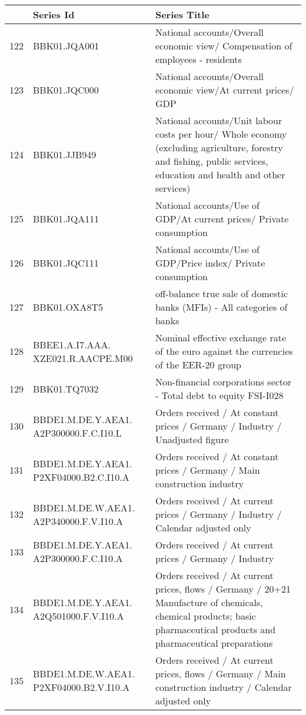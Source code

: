 \documentclass[11pt]{article}
\begin{document}
\begin{table}
\centering
\begin{tabular}{rp{5cm}p{11cm}}
& \textbf{Series Id} & \textbf{Series Title} \\
  \hline
  \hline
  122 & BBK01.JQA001 & National accounts/Overall economic view/ Compensation of employees - residents \\ 
  \hline
  123 & BBK01.JQC000 & National accounts/Overall economic view/At current prices/ GDP \\ 
  \hline
  124 & BBK01.JJB949 & National accounts/Unit labour costs per hour/ Whole economy (excluding agriculture, forestry and fishing, public services, education and health and other services) \\ 
  \hline
  125 & BBK01.JQA111 & National accounts/Use of GDP/At current prices/ Private consumption \\ 
  \hline
  126 & BBK01.JQC111 & National accounts/Use of GDP/Price index/ Private consumption \\ 
  \hline
  127 & BBK01.OXA8T5 & off-balance true sale of domestic banks (MFIs) - All categories of banks \\ 
  \hline
  128 & BBEE1.A.I7.AAA. XZE021.R.AACPE.M00 & Nominal effective exchange rate of the euro against the currencies of the EER-20 group \\ 
  \hline
  129 & BBK01.TQ7032 & Non-financial corporations sector - Total debt to equity FSI-I028 \\ 
  \hline
  130 & BBDE1.M.DE.Y.AEA1. A2P300000.F.C.I10.L & Orders received / At constant prices / Germany / Industry / Unadjusted figure \\ 
  \hline
  131 & BBDE1.M.DE.Y.AEA1. P2XF04000.B2.C.I10.A & Orders received / At constant prices / Germany / Main construction industry \\ 
  \hline
  132 & BBDE1.M.DE.W.AEA1. A2P340000.F.V.I10.A & Orders received / At current prices / Germany / Industry / Calendar adjusted only \\ 
  \hline
  133 & BBDE1.M.DE.Y.AEA1. A2P300000.F.C.I10.A & Orders received / At current prices / Germany / Industry \\ 
  \hline
  134 & BBDE1.M.DE.Y.AEA1. A2Q501000.F.V.I10.A & Orders received / At current prices, flows / Germany / 20+21 Manufacture of chemicals, chemical products; basic pharmaceutical products and pharmaceutical preparations \\ 
  \hline
  135 & BBDE1.M.DE.W.AEA1. P2XF04000.B2.V.I10.A & Orders received / At current prices, flows / Germany / Main construction industry / Calendar adjusted only \\ 

\end{tabular}
\end{table}
\end{document}
